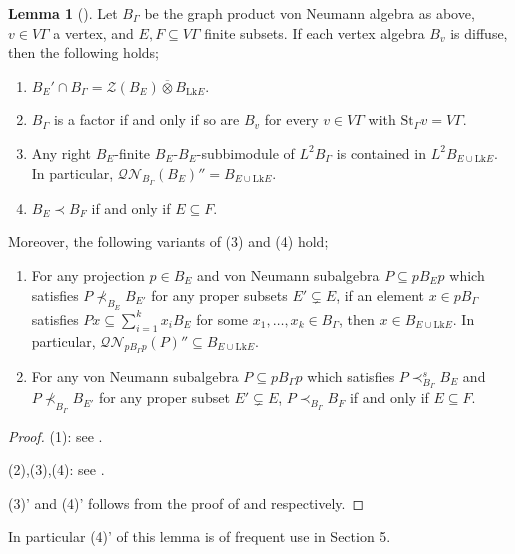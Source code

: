 \documentclass{amsart}
\theoremstyle{definition}
\newtheorem{lemma}[theorem]{Lemma}
\renewcommand{\subset}{\subseteq}
\begin{document}
\begin{lemma}[\cite{bcc,dv,hi}]
Let $B_{\Gamma}$ be the graph product von Neumann algebra as above, $v\in V\Gamma$ a vertex, and $E,F\subset V\Gamma$ finite subsets. 
If each vertex algebra $B_v$ is diffuse, then the following holds;
\begin{enumerate}
\item $B_E'\cap B_{\Gamma}=\mathcal{Z}(B_E)\overline{\otimes} B_{\mathrm{Lk}E}$. %
\item $B_{\Gamma}$ is a factor if and only if so are $B_v$ for every $v\in V\Gamma$ with $\mathrm{St}_{\Gamma}v=V\Gamma$.   %
\item Any right $B_E$-finite $B_E$-$B_E$-subbimodule of $L^2B_{\Gamma}$ is contained in $L^2B_{E\cup \mathrm{Lk}E}$. 
In particular, $\mathcal{QN}_{B_{\Gamma}}(B_E)''=B_{E\cup \mathrm{Lk}E}$.  %
\item $B_E\prec B_F$ if and only if $E\subset F$.  %
\end{enumerate}
Moreover, the following variants of (3) and (4) hold; 
\begin{enumerate}
\item[(3)'] For any projection $p\in B_E$ and von Neumann subalgebra $P\subset pB_{E}p$ which satisfies
$P\nprec_{B_E} B_{E'}$ for any proper subsets $E'\subsetneq E$, 
if an element $x\in pB_{\Gamma}$ satisfies 
$Px\subset \sum_{i=1}^k x_i B_{E}$ for some $x_1, \ldots , x_k\in B_{\Gamma}$, 
then $x\in B_{E\cup \mathrm{Lk}E}$. 
In particular, $\mathcal{QN}_{pB_{\Gamma}p}(P)''\subset B_{E\cup\mathrm{Lk}E}$. 
\item[(4)'] For any von Neumann subalgebra $P\subset pB_{\Gamma}p$ which satisfies $P\prec^s_{B_{\Gamma}} B_E$ and $P\nprec_{B_{\Gamma}} B_{E'}$ for any proper subset $E'\subsetneq E$, $P\prec_{B_{\Gamma}} B_F$ if and only if $E\subset F$.  %
\end{enumerate}
\end{lemma} 

\begin{proof}
(1): see \cite[Lemma 2.16]{hi}. 

(2),(3),(4): see \cite[Lemma 6.2]{dv}. 

(3)' and (4)' follows from the proof of 
\cite[Proposition 5.8]{bcc} and \cite[Claim 3.6]{hi} respectively. 
\end{proof}

In particular (4)' of this lemma is of frequent use in Section 5. 
\end{document}
